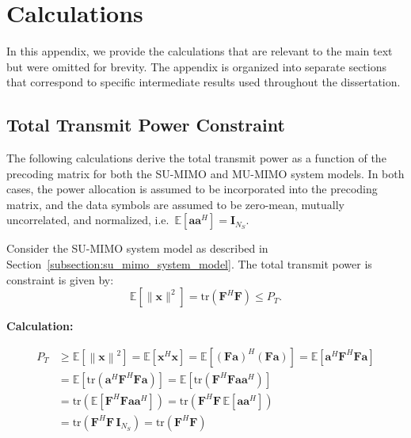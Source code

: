 \chapter{Calculations}
\label{appendix:calculations}

In this appendix, we provide the calculations that are relevant to the main text but were omitted for brevity.
The appendix is organized into separate sections that correspond to specific intermediate results used throughout the dissertation.

\section*{Total Transmit Power Constraint}
\label{calculation:transmit_power_constraint}

The following calculations derive the total transmit power as a function of the precoding matrix for both the \ac{SU}-\ac{MIMO} and \ac{MU}-\ac{MIMO} system models.
In both cases, the power allocation is assumed to be incorporated into the precoding matrix, and the data symbols are assumed to be zero-mean, mutually uncorrelated, and normalized, i.e.\ $\mathbb{E}\!\left[\mathbf{a}\mathbf{a}^H\right] = \mathbf{I}_{N_S}$.

Consider the \ac{SU}-\ac{MIMO} system model as described in Section~\ref{subsection:su_mimo_system_model}.
The total transmit power is constraint is given by:
\begin{equation*}
    \mathbb{E}\!\left[\|\mathbf{x}\|^2\right] = \mathrm{tr}\!\left(\mathbf{F}^H \mathbf{F}\right) \leq P_T.
\end{equation*}

\textbf{Calculation:}
\begin{fleqn}[2.5em]
\begin{subequations}
\begin{align*}
    P_T
    &\geq \mathbb{E}\!\left[ \left\|\mathbf{x}\right\|^2 \right]
    = \mathbb{E}\!\left[ \mathbf{x}^H \mathbf{x} \right]
    = \mathbb{E}\!\left[ \left(\mathbf{F} \mathbf{a}\right)^H \left(\mathbf{F} \mathbf{a}\right) \right]
    = \mathbb{E}\!\left[ \mathbf{a}^H \mathbf{F}^H \mathbf{F} \mathbf{a} \right] \\
    &= \mathbb{E}\!\left[ \mathrm{tr}\!\left( \mathbf{a}^H \mathbf{F}^H \mathbf{F} \mathbf{a} \right) \right]
    = \mathbb{E}\!\left[ \mathrm{tr}\!\left( \mathbf{F}^H \mathbf{F} \mathbf{a} \mathbf{a}^H \right) \right] \\
    &= \mathrm{tr}\!\left( \mathbb{E}\!\left[ \mathbf{F}^H \mathbf{F} \mathbf{a} \mathbf{a}^H \right] \right)
    = \mathrm{tr}\!\left( \mathbf{F}^H \mathbf{F} \, \mathbb{E}\!\left[ \mathbf{a} \mathbf{a}^H \right] \right) \\
    &= \mathrm{tr}\!\left( \mathbf{F}^H \mathbf{F} \, \mathbf{I}_{N_S} \right)
    = \mathrm{tr}\!\left( \mathbf{F}^H \mathbf{F} \right)
\end{align*}
\end{subequations}
\end{fleqn}

